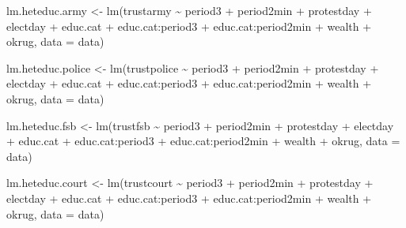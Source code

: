 \documentclass[
  letterpaper,
  DIV=11,
  numbers=noendperiod]{scrartcl}
\newenvironment{Shaded}{\begin{snugshade}}{\end{snugshade}}
\newcommand{\AttributeTok}[1]{\textcolor[rgb]{0.40,0.45,0.13}{#1}}
\newcommand{\FunctionTok}[1]{\textcolor[rgb]{0.28,0.35,0.67}{#1}}
\newcommand{\NormalTok}[1]{\textcolor[rgb]{0.00,0.23,0.31}{#1}}
\newcommand{\OtherTok}[1]{\textcolor[rgb]{0.00,0.23,0.31}{#1}}
\newcommand{\SpecialCharTok}[1]{\textcolor[rgb]{0.37,0.37,0.37}{#1}}
\begin{document}
\begin{Shaded}
\begin{Highlighting}[]
\NormalTok{lm.heteduc.army }\OtherTok{\textless{}{-}} \FunctionTok{lm}\NormalTok{(trustarmy }\SpecialCharTok{\textasciitilde{}}\NormalTok{ period3 }\SpecialCharTok{+}\NormalTok{ period2min }\SpecialCharTok{+}\NormalTok{ protestday }\SpecialCharTok{+}\NormalTok{ electday }\SpecialCharTok{+}
\NormalTok{                        educ.cat }\SpecialCharTok{+}\NormalTok{ educ.cat}\SpecialCharTok{:}\NormalTok{period3 }\SpecialCharTok{+}\NormalTok{ educ.cat}\SpecialCharTok{:}\NormalTok{period2min }\SpecialCharTok{+}
\NormalTok{                        wealth }\SpecialCharTok{+}\NormalTok{ okrug, }\AttributeTok{data =}\NormalTok{ data)}

\NormalTok{lm.heteduc.police }\OtherTok{\textless{}{-}} \FunctionTok{lm}\NormalTok{(trustpolice }\SpecialCharTok{\textasciitilde{}}\NormalTok{ period3 }\SpecialCharTok{+}\NormalTok{ period2min }\SpecialCharTok{+}\NormalTok{ protestday }\SpecialCharTok{+}\NormalTok{ electday }\SpecialCharTok{+}
\NormalTok{                          educ.cat }\SpecialCharTok{+}\NormalTok{ educ.cat}\SpecialCharTok{:}\NormalTok{period3 }\SpecialCharTok{+}\NormalTok{ educ.cat}\SpecialCharTok{:}\NormalTok{period2min }\SpecialCharTok{+}
\NormalTok{                          wealth }\SpecialCharTok{+}\NormalTok{ okrug, }\AttributeTok{data =}\NormalTok{ data)}

\NormalTok{lm.heteduc.fsb }\OtherTok{\textless{}{-}} \FunctionTok{lm}\NormalTok{(trustfsb }\SpecialCharTok{\textasciitilde{}}\NormalTok{ period3 }\SpecialCharTok{+}\NormalTok{ period2min }\SpecialCharTok{+}\NormalTok{ protestday }\SpecialCharTok{+}\NormalTok{ electday }\SpecialCharTok{+}
\NormalTok{                       educ.cat }\SpecialCharTok{+}\NormalTok{ educ.cat}\SpecialCharTok{:}\NormalTok{period3 }\SpecialCharTok{+}\NormalTok{ educ.cat}\SpecialCharTok{:}\NormalTok{period2min }\SpecialCharTok{+}
\NormalTok{                       wealth }\SpecialCharTok{+}\NormalTok{ okrug, }\AttributeTok{data =}\NormalTok{ data)}

\NormalTok{lm.heteduc.court }\OtherTok{\textless{}{-}} \FunctionTok{lm}\NormalTok{(trustcourt }\SpecialCharTok{\textasciitilde{}}\NormalTok{ period3 }\SpecialCharTok{+}\NormalTok{ period2min }\SpecialCharTok{+}\NormalTok{ protestday }\SpecialCharTok{+}\NormalTok{ electday }\SpecialCharTok{+}
\NormalTok{                         educ.cat }\SpecialCharTok{+}\NormalTok{ educ.cat}\SpecialCharTok{:}\NormalTok{period3 }\SpecialCharTok{+}\NormalTok{ educ.cat}\SpecialCharTok{:}\NormalTok{period2min }\SpecialCharTok{+}
\NormalTok{                         wealth }\SpecialCharTok{+}\NormalTok{ okrug, }\AttributeTok{data =}\NormalTok{ data)}


\end{Highlighting}
\end{Shaded}
\end{document}

